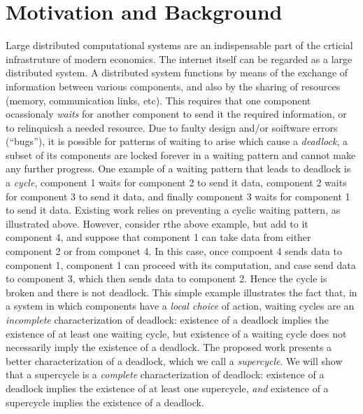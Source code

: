 \section{Motivation and Background}

Large distributed computational systems are an indispensable part of the crticial infrastruture of modern economics. The internet itself can be
regarded as a large distributed system.
%
A distributed system functions by means of the exchange of information between various components, and also by the sharing of resources (\eg memory,
communication links, etc). This requires that one component ocassionaly \emph{waits} for another component to send it the required information, or to
relinquicsh a needed resource.  Due to faulty design and/or soiftware errors (``bugs''), it is possible for patterns of waiting to arise which cause a
{\em deadlock}, \ie a subset of its components are locked forever in a waiting pattern and cannot make any further progress.
%
One example of a waiting pattern that leads to deadlock is a \emph{cycle}, \eg component 1 waits for component 2 to send it data, 
component 2 waits for component 3 to send it data, and finally 
component 3 waits for component 1 to send it data.
%
Existing work relies on preventing a cyclic waiting pattern, as illustrated above. However, consider rthe above example, but add to it component 4,
and suppose that component 1 can take data from either component 2 or from componet 4. In this case, once compoent 4 sends data to component 1,
component 1 can proceed with its computation, and case send data to component 3, which then sends data to component 2. Hence the cycle is broken and
there is not deadlock.
%
This simple example illustrates the fact that, in a system in which components have a \emph{local choice} of action, waiting cycles are an
\emph{incomplete} characterization of deadlock: existence of a deadlock implies the existence of at least one waiting cycle, but existence of a
waiting cycle does not necessarily imply the existence of a deadlock.
%
The proposed work presents a better characterization of a deadlock, which we call a \emph{supercycle}. We will show that a supercycle is a 
\emph{complete} characterization of deadlock: existence of a deadlock implies the existence of at least one supercycle, \emph{and} existence of a
supercycle implies the existence of a deadlock.

